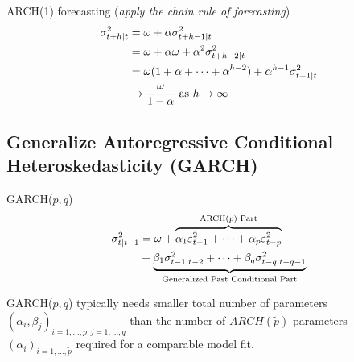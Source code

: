 \documentclass[11pt]{article}
\begin{document}
            \begin{remark}
                ARCH(1) forecasting (\emph{apply the chain rule of forecasting})
                \begin{align}
                    \sigma_{t+h|t}^2 &= \omega + \alpha \sigma_{t+h-1|t}^2 \\
                    &= \omega + \alpha \omega + \alpha^2 \sigma_{t+h-2|t}^2 \\
                    &= \omega(1 + \alpha + \dots + \alpha^{h-2}) + \alpha^{h-1} \sigma_{t+1|t}^2 \\
                    &\to \frac{\omega}{1 - \alpha} \text{{ as }} h \to \infty
                \end{align}
            \end{remark}

        \subsection{Generalize Autoregressive Conditional Heteroskedasticity (GARCH)}
            \begin{definition}
                GARCH($p,q$)
                \begin{align}
                     \sigma_{t|t-1}^2 &= \omega + \overbrace{
                        \alpha_1 \varepsilon_{t-1}^2 + \cdots + \alpha_p \varepsilon_{t-p}^2
                     }^{\text{{ARCH($p$) Part}}} \\
                     &+ \underbrace{\beta_1 \sigma_{t-1|t-2}^2 + \cdots + \beta_q \sigma_{t-q|t-q-1}^2}_{\text{{Generalized Past Conditional Part}}}
                \end{align}
            \end{definition}
            
            \begin{remark}
                GARCH($p,q$) typically needs smaller total number of parameters $(\alpha_i, \beta_j)_{i=1,\dots,p; j=1,\dots,q}$ than the number of $ARCH(\tilde{p})$ parameters $(\alpha_i)_{i=1,\dots,\tilde{p}}$ required for a comparable model fit.
            \end{remark}
            
\end{document}
